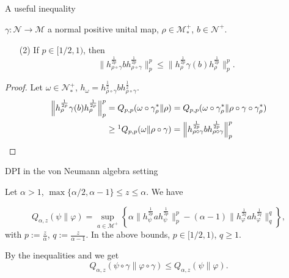 \documentclass[mathserif]{beamer}
\newcommand{\<}{\langle}
\renewcommand{\>}{\rangle}
\newcommand{\Me}{\mathcal M}
\newcommand{\Ne}{\mathcal N}
\begin{document}
\begin{frame}{A useful inequality}

 $\gamma:\Ne\to \Me$  a normal positive unital map,  $\rho\in \Me_*^+$,  $b\in \Ne^+$. 

\bigskip
\begin{enumerate}
\item[(2)] If $p\in [1/2,1)$, then 
\[
\Big\|h_{\rho\circ\gamma}^{\frac{1}{2p}}bh_{\rho\circ\gamma}^{\frac{1}{2p}}\Big\|^p_p\le
\Big\|h_{\rho}^{\frac{1}{2p}}\gamma(b)h_{\rho}^{\frac{1}{2p}}\Big\|^p_p.
\]
\end{enumerate}

\begin{proof} Let $\omega\in \Ne_*^+$,
$h_\omega=h_{\rho\circ\gamma}^{\frac12}bh_{\rho\circ\gamma}^{\frac12}$.
\begin{align*}
\Big\|h_{\rho}^{\frac{1}{2p}}\gamma(b)h_{\rho}^{\frac{1}{2p}}\Big\|^p_p&=Q_{p,p}(\omega\circ
\gamma^*_\rho\|\rho)=Q_{p,p}(\omega\circ
\gamma^*_\rho\|\rho\circ\gamma\circ\gamma_\rho^*)\\
&\ge\footnotemark 
Q_{p,p}(\omega\|\rho\circ\gamma)=\Big\|h_{\rho\circ\gamma}^{\frac{1}{2p}}bh_{\rho\circ\gamma}^{\frac{1}{2p}}\Big\|^p_p
\end{align*}



\end{proof}




\end{frame}

\begin{frame}{DPI in the von Neumann algebra setting}



Let $\alpha>1$, $\max\{\alpha/2,\alpha-1\}\le z\le \alpha$.  We have

\medskip 

\[
Q_{\alpha,z}(\psi\|\varphi)=\sup_{a\in \Me^{+}}\left\{\alpha
\Big\|h_\psi^{\frac{1}{2p}}ah_\psi^{\frac{1}{2p}}\Big\|_p^{p}
-(\alpha-1) \Big\|h_\varphi^{\frac{1}{2q}}ah_\varphi^{\frac{1}{2q}}\Big\|_q^{q}
\right\},
\]
with $p:=\frac{z}{\alpha}$, $q:=\frac{z}{\alpha-1}$. In the above bounds, $p\in [1/2,1)$,
$q\ge 1$.

\bigskip

By the inequalities  and  
we get
\[
Q_{\alpha,z}(\psi\circ\gamma\|\varphi\circ\gamma)\le Q_{\alpha,z}(\psi\|\varphi).
\]

\end{frame}
\end{document}

